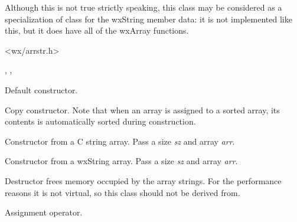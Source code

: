 
Although this is not true strictly speaking, this class may be considered as a
specialization of  class for the wxString member
data: it is not implemented like this, but it does have all of the wxArray
functions.


<wx/arrstr.h>


, , 


\label{wxarraystringctor}


Default constructor.


Copy constructor. Note that when an array is assigned to a sorted array, its contents is
automatically sorted during construction.


Constructor from a C string array. Pass a size {\it sz} and array {\it arr}.


Constructor from a wxString array. Pass a size {\it sz} and array {\it arr}.

\label{wxarraystringdtor}


Destructor frees memory occupied by the array strings. For the performance
reasons it is not virtual, so this class should not be derived from.

\label{wxarraystringoperatorassign}


Assignment operator.

\label{wxarraystringoperatorequal}


